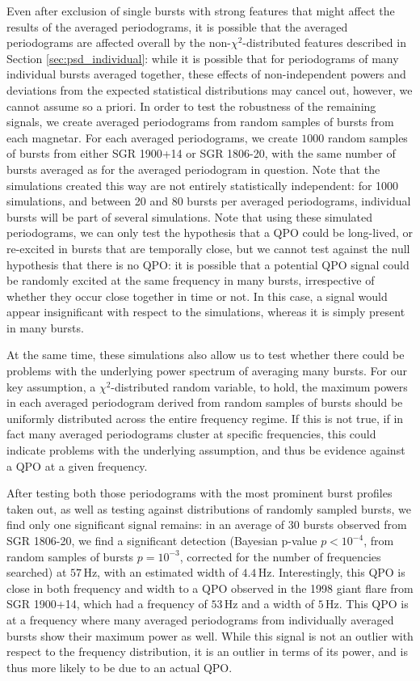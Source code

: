 \documentclass[numberedappendix]{emulateapj}
\newcommand{\hz}{\,\mathrm{Hz}}
\begin{document}
Even after exclusion of single bursts with strong features that might affect the results of the averaged periodograms, it is possible that the averaged periodograms are affected overall by the non-$\chi^2$-distributed features described in Section \ref{sec:psd_individual}: while it is possible that for periodograms of many individual bursts averaged together, these effects of non-independent powers and deviations from the expected statistical distributions may cancel out, however, we cannot assume so a priori. 
In order to test the robustness of the remaining signals, we create averaged periodograms from random samples of bursts from each magnetar. For each averaged periodograms, we create $1000$ random samples of bursts from either SGR 1900+14 or SGR 1806-20, with the same number of bursts averaged as for the averaged periodogram in question. Note that the simulations created this way are not entirely statistically independent: for 1000 simulations, and between 20 and 80 bursts per averaged periodograms, individual bursts will be part of several simulations. Note that using these simulated periodograms, we can only test the hypothesis that a QPO could be long-lived, or re-excited in bursts that are temporally close, but we cannot test against the null hypothesis that there is no QPO: it is possible that a potential QPO signal could be randomly excited at the same frequency in many bursts, irrespective of whether they occur close together in time or not. In this case, a signal would appear insignificant with respect to the simulations, whereas it is simply present in many bursts. 

At the same time, these simulations also allow us to test whether there could be problems with the underlying power spectrum of averaging many bursts. For our key assumption, a $\chi^2$-distributed random variable, to hold, the maximum powers in each averaged periodogram derived from random samples of bursts should be uniformly distributed across the entire frequency regime. If this is not true, if in fact many averaged periodograms cluster at specific frequencies, this could indicate problems with the underlying assumption, and thus be evidence against a QPO at a given frequency.

After testing both those periodograms with the most prominent burst profiles taken out, as well as testing against distributions of randomly sampled bursts, we find only one significant signal remains: in an average of $30$ bursts observed from SGR 1806-20, we find a significant detection (Bayesian p-value $p < 10^{-4}$, from random samples of bursts $p = 10^{-3}$, corrected for the number of frequencies searched) at $57 \hz$, with an estimated width of $4.4 \hz$. Interestingly, this QPO is close in both frequency and width to a QPO observed in the 1998 giant flare from SGR 1900+14, which had a frequency of $53\hz$ and a width of $5\hz$. This QPO is at a frequency where many averaged periodograms from individually averaged bursts show their maximum power as well. While this signal is not an outlier with respect to the frequency distribution, it is an outlier in terms of its power, and is thus more likely to be due to an actual QPO.
\end{document}
